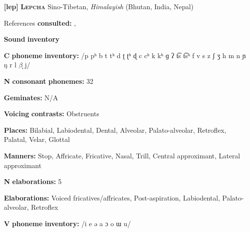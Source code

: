 \begin{styleBody}
\textbf{[lep]}   \textbf{\textsc{Lepcha}}    Sino-Tibetan, \textit{Himalayish} (Bhutan, India, Nepal)
\end{styleBody}

\begin{styleBody}
References \textbf{consulted:} \citet{Plaisier2007}, \citet{Sprigg1966}
\end{styleBody}

\begin{styleBody}
\textbf{Sound} \textbf{inventory}
\end{styleBody}

\begin{styleBody}
\textbf{C} \textbf{phoneme} \textbf{inventory:} /p pʰ b t tʰ d ʈ ʈʰ ɖ c cʰ k kʰ ɡ ʔ t͡s t͡sʰ f v s z ʃ ʒ h m n ɲ ŋ r l $\beta ̞$ j/
\end{styleBody}

\begin{styleBody}
\textbf{N} \textbf{consonant} \textbf{phonemes:} 32
\end{styleBody}

\begin{styleBody}
\textbf{Geminates:} N/A
\end{styleBody}

\begin{styleBody}
\textbf{Voicing} \textbf{contrasts:} Obstruents
\end{styleBody}

\begin{styleBody}
\textbf{Places:} Bilabial, Labiodental, Dental, Alveolar, Palato-alveolar, Retroflex, Palatal, Velar, Glottal
\end{styleBody}

\begin{styleBody}
\textbf{Manners:} Stop, Affricate, Fricative, Nasal, Trill, Central approximant, Lateral approximant
\end{styleBody}

\begin{styleBody}
\textbf{N} \textbf{elaborations:} 5
\end{styleBody}

\begin{styleBody}
\textbf{Elaborations:} Voiced fricatives/affricates, Post-aspiration, Labiodental, Palato-alveolar, Retroflex
\end{styleBody}

\begin{styleBody}
\textbf{V} \textbf{phoneme} \textbf{inventory:} /i e ə a ɔ o ɯ u/
\end{styleBody}

